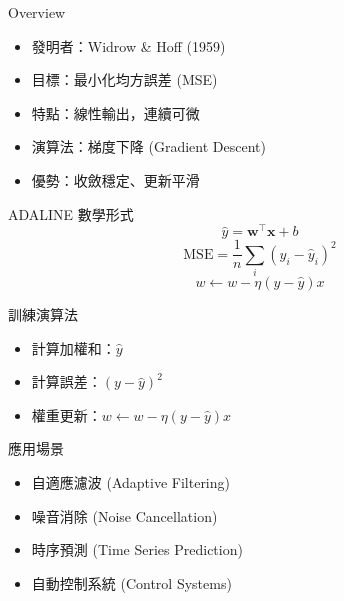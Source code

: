 \documentclass{beamer}
\begin{document}
\begin{frame}{Overview}
  \begin{itemize}
    \item 發明者：Widrow \& Hoff (1959)
    \item 目標：最小化均方誤差 (MSE)
    \item 特點：線性輸出，連續可微
    \item 演算法：梯度下降 (Gradient Descent)
    \item 優勢：收斂穩定、更新平滑
  \end{itemize}
\end{frame}

\begin{frame}{ADALINE 數學形式}
  \[
    \hat y=\mathbf{w}^\top\mathbf{x}+b
  \]
  \[
    \mathrm{MSE}=\frac1n\sum_i(y_i-\hat y_i)^2
  \]
  \[
    w\leftarrow w-\eta(y-\hat y)x
  \]
\end{frame}

\begin{frame}{訓練演算法}
  \begin{itemize}
    \item 計算加權和：$\hat y$
    \item 計算誤差：$(y-\hat y)^2$
    \item 權重更新：$w\leftarrow w-\eta(y-\hat y)x$
  \end{itemize}
\end{frame}

\begin{frame}{應用場景}
  \begin{itemize}
    \item 自適應濾波 (Adaptive Filtering)
    \item 噪音消除 (Noise Cancellation)
    \item 時序預測 (Time Series Prediction)
    \item 自動控制系統 (Control Systems)
  \end{itemize}
\end{frame}
\end{document}
